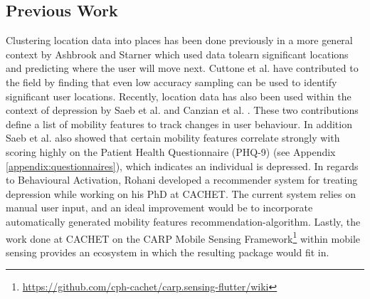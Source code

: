 \subsection*{Previous Work}
Clustering location data into places has been done previously in a more general context by Ashbrook and Starner \cite{learning_significant_locations}which used data tolearn significant locations and predicting where the user will move next. Cuttone et al. \cite{sparse-location-2014} have contributed to the field by finding that even low accuracy sampling can be used to identify significant user locations. Recently, location data has also been used within the context of depression by Saeb et al. \cite{Saeb2015} and Canzian et al. \cite{Canzian2015}. These two contributions define a list of mobility features to track changes in user behaviour. In addition Saeb et al. \cite{Saeb2015} also showed that certain mobility features correlate strongly with scoring highly on the Patient Health Questionnaire (PHQ-9) (see Appendix \ref{appendix:questionnaires}), which indicates an individual is depressed. In regards to Behavioural Activation, Rohani \cite{mubs-rohani, moribus} developed a recommender system for treating depression while working on his PhD at CACHET. The current system relies on manual user input, and an ideal improvement would be to incorporate automatically generated mobility features recommendation-algorithm. Lastly, the work done at CACHET on the CARP Mobile Sensing Framework\footnote{\url{https://github.com/cph-cachet/carp.sensing-flutter/wiki}} within mobile sensing provides an ecosystem in which the resulting package would fit in.